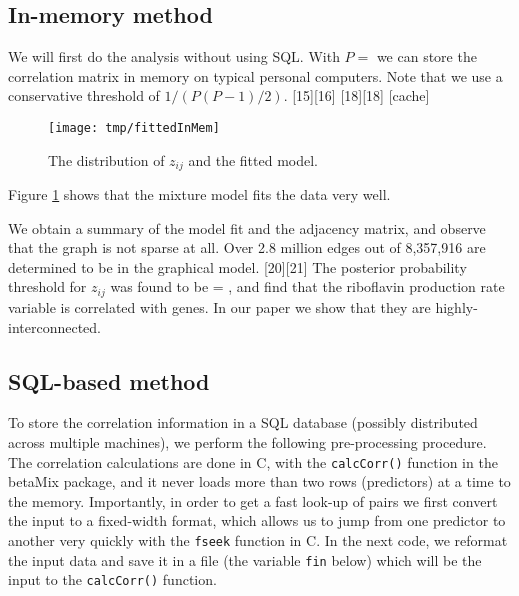 \documentclass[a4paper,10pt]{article}
\let\code\texttt
\let\proglang\textsf
\newcommand{\pkg}[1]{{\fontshape{it}\selectfont #1}}
\begin{document}
\subsection{In-memory method}

We will first do the analysis without using SQL. With $P=$ we can store the correlation matrix in memory on typical personal computers. Note that we use a conservative threshold of $1/(P(P-1)/2)$.
[15][16]
[18][18]
[cache]
\begin{figure}[htbp]
\begin{center}
\texttt{[image: tmp/fittedInMem]}
\caption{The distribution of $z_{ij}$ and the fitted model.}
\label{fittedMem}
\end{center}
\end{figure}
Figure \ref{fittedMem} shows that the mixture model fits the data very well. 

We obtain a summary of the model fit and the adjacency matrix, and observe that the graph is not sparse at all. Over 2.8 million edges out of 8,357,916 are determined to be in the graphical model.
[20][21]
The posterior probability threshold for $z_{ij}$ was found to be = , and find that the riboflavin production rate variable is correlated with  genes. In our paper we show that they are highly-interconnected.

\subsection{SQL-based method}
To store the correlation information in a SQL database (possibly distributed across multiple machines), we perform the following pre-processing procedure. The correlation calculations are done in \proglang{C}, with the \code{calcCorr()}  function in the \pkg{betaMix} package, and it never loads more than two rows (predictors) at a time to the memory. Importantly, in order to get a fast look-up of pairs we first convert the input to a fixed-width format, which allows us to jump from one predictor to another very quickly with the \code{fseek} function in \proglang{C}. In the next code, we reformat the input data and save it in a file (the variable \code{fin} below) which will be the input to the \code{calcCorr()} function.
\end{document}
